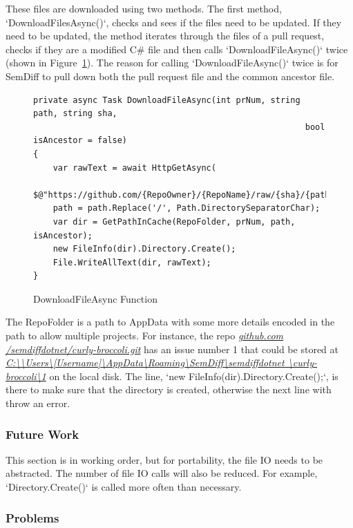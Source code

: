 \documentclass[draftclsnofoot,onecolumn]{IEEEtran}
\begin{document}
These files are downloaded using two methods. The first method, 
`DownloadFilesAsync()`, checks and sees if the files need to be 
updated. If they need to be updated, the method iterates through the files of 
a pull request, checks if they are a modified C\# file and then calls 
`DownloadFileAsync()` twice (shown in Figure~\ref{DownloadFileAsync}). The 
reason for calling `DownloadFileAsync()` twice is for SemDiff to pull down 
both the pull request file and the common ancestor file. 

\begin{figure}[!t]
\centering
\begin{lstlisting}
private async Task DownloadFileAsync(int prNum, string path, string sha, 
                                                       bool isAncestor = false)
{
    var rawText = await HttpGetAsync(
	           $@"https://github.com/{RepoOwner}/{RepoName}/raw/{sha}/{path}");
    path = path.Replace('/', Path.DirectorySeparatorChar);
    var dir = GetPathInCache(RepoFolder, prNum, path, isAncestor);
    new FileInfo(dir).Directory.Create();
    File.WriteAllText(dir, rawText);
}
\end{lstlisting}
\caption{DownloadFileAsync Function}
\label{DownloadFileAsync}
\end{figure}

The RepoFolder is a path to AppData with some more details encoded in the path 
to allow multiple projects. For instance, the repo \textit{\url{github.com
/semdiffdotnet/curly-broccoli.git}} has an issue number 1 that could be stored 
at \textit{\url{C:\\Users\[Username]\AppData\Roaming\SemDiff\semdiffdotnet
\curly-broccoli\1}} on the local disk. The line, 
`new FileInfo(dir).Directory.Create();`, is there to make sure that the 
directory is created, otherwise the next line with throw an error.

\subsubsection{Future Work}

This section is in working order, but for portability, the file IO needs to be 
abstracted. The number of file IO calls will also be reduced. For example, 
`Directory.Create()` is called more often than necessary.

\subsubsection{Problems}
\end{document}
